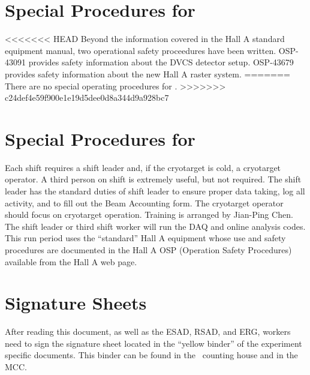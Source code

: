 %
\newpage
\section{Special Procedures for \HALL}

<<<<<<< HEAD
Beyond the information covered in the Hall A standard equipment manual,
two operational safety proceedures have been written.
OSP-43091
provides safety information about the DVCS detector setup.  OSP-43679 provides
safety information about the new Hall A raster system.
=======
There are no special operating procedures for \HALL{}.
>>>>>>> c24def4e59f900e1e19d5dee0d8a344d9a928bc7

%
\newpage
\section{Special Procedures for \EXPTS}

Each shift requires a shift leader and, if the cryotarget is cold, a cryotarget 
operator.  A third person on shift is extremely useful, but not required. The shift leader 
has the standard
duties of shift leader to ensure proper data taking, log all activity, and to fill out
the Beam Accounting form. The cryotarget operator should focus on cryotarget
operation. Training is arranged by Jian-Ping Chen. The shift leader or third
shift worker will run the DAQ and online analysis codes.
This run period uses the ``standard'' Hall A equipment whose
use and safety procedures are documented in the Hall A OSP (Operation Safety
Procedures) available from the Hall A web page.

\newpage
\section{Signature Sheets}

After reading this document, as well as the ESAD, RSAD, and ERG, workers need to sign
the signature sheet located in the ``yellow binder'' of the experiment specific documents.
This binder can be found in the \HALL\ counting house and in the MCC.

